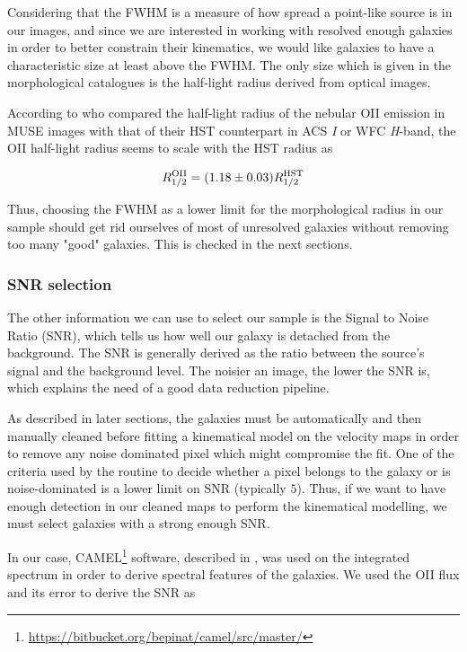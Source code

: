 Considering that the FWHM is a measure of how spread a point-like source is in our images, and since we are interested in working with resolved enough galaxies in order to better constrain their kinematics, we would like galaxies to have a characteristic size at least above the FWHM. The only size which is given in the morphological catalogues is the half-light radius derived from optical images. 

According to  who compared the half-light radius of the nebular OII emission in MUSE images with that of their HST counterpart in ACS \textit{I} or WFC \textit{H}-band, the OII half-light radius seems to scale with the HST radius as 

\begin{equation}
	R_{1/2}^{\rm{OII}} = (1.18 \pm 0.03) R_{1/2}^{\rm{HST}}
\end{equation}

Thus, choosing the FWHM as a lower limit for the morphological radius in our sample should get rid ourselves of most of unresolved galaxies without removing too many "good" galaxies. This is checked in the next sections.

\subsubsection{SNR selection}

The other information we can use to select our sample is the Signal to Noise Ratio (SNR), which tells us how well our galaxy is detached from the background. The SNR is generally derived as the ratio between the source's signal and the background level. The noisier an image, the lower the SNR is, which explains the need of a good data reduction pipeline.

As described in later sections, the galaxies must be automatically and then manually cleaned before fitting a kinematical model on the velocity maps in order to remove any noise dominated pixel which might compromise the fit. One of the criteria used by the routine to decide whether a pixel belongs to the galaxy or is noise-dominated is a lower limit on SNR (typically $5$). Thus, if we want to have enough detection in our cleaned maps to perform the kinematical modelling, we must select galaxies with a strong enough SNR.

In our case, \textsc{CAMEL}\footnote{\url{https://bitbucket.org/bepinat/camel/src/master/}} software, described in , was used on the integrated spectrum in order to derive spectral features of the galaxies. We used the OII flux and its error to derive the SNR as

